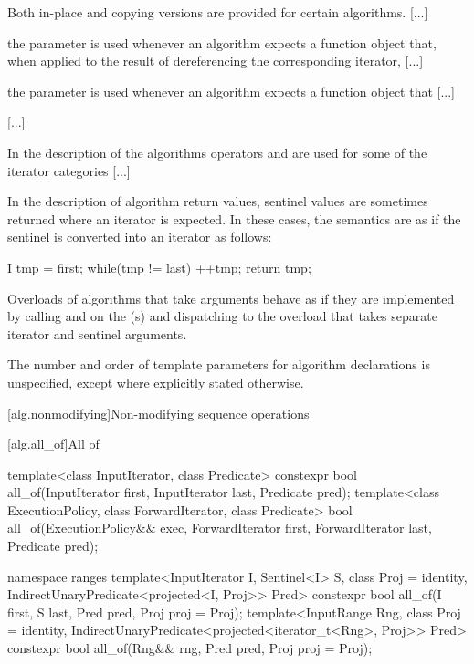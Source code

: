 \pnum
Both in-place and copying versions are provided for certain
algorithms. [...]

\pnum
{} the
parameter is used whenever an algorithm expects a function object
that, when applied to the result
of dereferencing the corresponding iterator, [...]

\pnum
{} the
parameter is used whenever an algorithm expects a function object that [...]

[...]

\setcounter{Paras}{10}
\pnum
In the description of the algorithms operators
\tcode{+}
and
\tcode{-}
are used for some of the iterator categories [...]

\begin{addedblock}
\pnum
In the description of algorithm return values, sentinel values are sometimes
returned where an iterator is expected. In these cases, the semantics are as
if the sentinel is converted into an iterator as follows:

\begin{codeblock}
I tmp = first;
while(tmp != last)
  ++tmp;
return tmp;
\end{codeblock}

\pnum
Overloads of algorithms that take  arguments
behave as if they are implemented by calling  and
 on the (s) and dispatching
to the overload that takes separate iterator and sentinel arguments.

\pnum
The number and order of template parameters for algorithm declarations
is unspecified, except where explicitly stated otherwise.
\end{addedblock}

\setcounter{section}{4}
[alg.nonmodifying]{Non-modifying sequence operations}

[alg.all_of]{All of}

%
\begin{itemdecl}
template<class InputIterator, class Predicate>
  constexpr bool all_of(InputIterator first, InputIterator last, Predicate pred);
template<class ExecutionPolicy, class ForwardIterator, class Predicate>
  bool all_of(ExecutionPolicy&& exec, ForwardIterator first, ForwardIterator last,
              Predicate pred);
\end{itemdecl}\begin{addedblock}\begin{itemdecl}
namespace ranges {
  template<InputIterator I, Sentinel<I> S, class Proj = identity,
      IndirectUnaryPredicate<projected<I, Proj>> Pred>
    constexpr bool all_of(I first, S last, Pred pred, Proj proj = Proj{});
  template<InputRange Rng, class Proj = identity,
      IndirectUnaryPredicate<projected<iterator_t<Rng>, Proj>> Pred>
    constexpr bool all_of(Rng&& rng, Pred pred, Proj proj = Proj{});
}
\end{itemdecl}
\end{addedblock}

